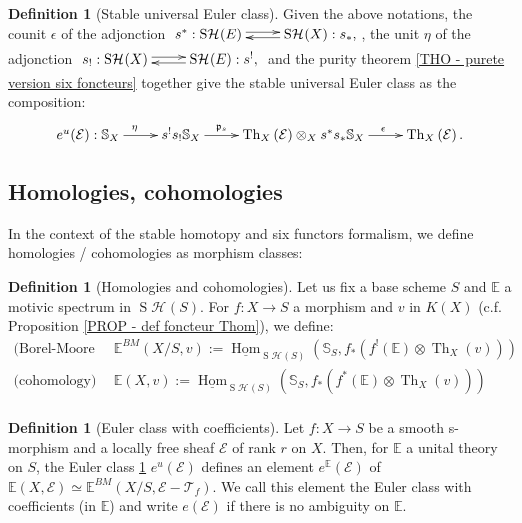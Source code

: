 \documentclass{amsart}
\theoremstyle{plain}%
\theoremstyle{remark}
\theoremstyle{definition}
\newtheorem{deff}[subsubsection]{Definition}
\newcommand{\cE}{\mathcal{E}}
\newcommand{\cH}{\mathcal{H}}
\newcommand{\cT}{\mathcal{T}}
\newcommand{\eE}{\mathbb{E}}
\newcommand{\eS}{\mathbb{S}}
\newcommand{\fp}{\mathfrak{p}}
\newcommand{\Thom}[2][]{\operatorname{Th}_{#1}\left(#2\right)}
\newcommand{\ulHom}[2][]{\underline{\operatorname{Hom}}_{#1}\left(#2\right)}
\newcommand{\StableHo}[2][]{\operatorname{S}\!\cH^{#1}\!\left(#2\right)}
\begin{document}
\begin{deff}[Stable universal Euler class]\label{DEF - classe Euler univ stable}
Given the above notations, the counit $\epsilon$ of the adjonction $\xymatrix{s^\ast : \StableHo{E} \ar@<+2pt>[r] & \StableHo{X} : s_{\ast}, \ar@<+2pt>[l]}$, the unit $ \eta$ of the adjonction $\xymatrix{s_! : \StableHo{X} \ar@<+2pt>[r] & \StableHo{E} : s^{!}, \ar@<+2pt>[l]}$ and the purity theorem \ref{THO - purete version six foncteurs} together give the stable universal Euler class as the composition:
\[\xymatrix{e^u(\cE) : \eS_X \ar[r]^\eta & s^! s_{!}\eS_X \ar[r]^{\fp_{s}\qquad \quad } & \Thom[X]{\cE}\otimes_X s^\ast s_{\ast}\eS_X \ar[r]^{\qquad\epsilon}&\Thom[X]{\cE} .}\]
\end{deff}


\subsection{Homologies, cohomologies}

In the context of the stable homotopy and six functors formalism, we define homologies / cohomologies as morphism classes:

\begin{deff}[Homologies and cohomologies]\label{DEF - homologies et cohomologies}
Let us fix a base scheme $S$ and $\eE$ a motivic spectrum in $\StableHo{S}$. For $f : X \to S$ a morphism and $v$ in $K(X)$ (c.f. Proposition \ref{PROP - def foncteur Thom}), we define:
\begin{align*}
\text{(Borel-Moore homology)}\ &\ \eE^{BM}(X/S,v) := \ulHom[\StableHo{S}]{\eS_S,f_\ast(f^!(\eE) \otimes\Thom[X]{v})}\\
\text{(cohomology)}\ &\ \eE(X,v) := \ulHom[\StableHo{S}]{\eS_S,f_\ast(f^\ast(\eE) \otimes\Thom[X]{v})}\\
\end{align*}
\end{deff}


\begin{deff}[Euler class with coefficients]\label{DEF - Euler class with coefficients}
Let $f: X \to S$ be a smooth s-morphism and a locally free sheaf $\cE$ of rank $r$ on $X$. Then, for $\eE$ a unital theory on $S$, the Euler class \ref{DEF - classe Euler univ stable} $e^u(\cE)$ defines an element $e^\eE(\cE)$ of $\eE(X,\cE)\simeq \eE^{BM}(X/S,\cE-\cT_f).$ We call this element the Euler class with coefficients (in $\eE$) and write $e(\cE)$ if there is no ambiguity on $\eE.$
\end{deff}
\end{document}
